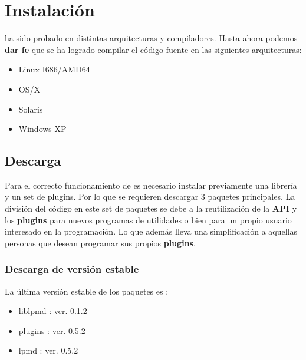\chapter{Instalaci\'on}
\label{chap:inst}

{\lpmd} ha sido probado en distintas arquitecturas y compiladores. Hasta ahora podemos \textbf{dar fe} que se ha logrado compilar el c\'odigo fuente en las siguientes arquitecturas:

\begin{itemize}
 \item Linux I686/AMD64
 \item OS/X
 \item Solaris
 \item Windows XP
\end{itemize}

\section{Descarga}

Para el correcto funcionamiento de {\lpmd} es necesario instalar previamente una librer\'ia y un set de plugins. Por lo que se requieren descargar 3 paquetes principales. La divisi\'on del c\'odigo en este set de paquetes se debe a la reutilizaci\'on de la \textbf{API} y los \textbf{plugins} para nuevos programas de utilidades o bien para un propio usuario interesado en la programaci\'on. Lo que adem\'as lleva una simplificaci\'on a aquellas personas que desean programar sus propios \textbf{plugins}.

\subsection{Descarga de versi\'on estable}

La \'ultima versi\'on estable de los paquetes es :

\begin{itemize}
 \item liblpmd : ver. 0.1.2
 \item plugins : ver. 0.5.2
 \item lpmd    : ver. 0.5.2
\end{itemize}


